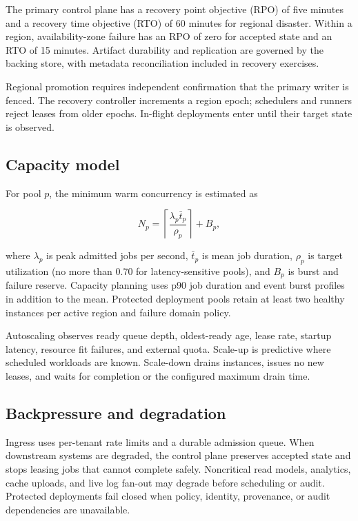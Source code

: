 The primary control plane has a recovery point objective (RPO) of five minutes and a
recovery time objective (RTO) of 60 minutes for regional disaster. Within a region,
availability-zone failure has an RPO of zero for accepted state and an RTO of 15 minutes.
Artifact durability and replication are governed by the backing store, with metadata
reconciliation included in recovery exercises.

Regional promotion requires independent confirmation that the primary writer is fenced.
The recovery controller increments a region epoch; schedulers and runners reject leases
from older epochs. In-flight deployments enter  until
their target state is observed.

\subsection{Capacity model}

For pool $p$, the minimum warm concurrency is estimated as

\[
  N_p = \left\lceil \frac{\lambda_p \bar{t}_p}{\rho_p} \right\rceil + B_p,
\]

where $\lambda_p$ is peak admitted jobs per second, $\bar{t}_p$ is mean job duration,
$\rho_p$ is target utilization (no more than 0.70 for latency-sensitive pools), and
$B_p$ is burst and failure reserve. Capacity planning uses p90 job duration and event
burst profiles in addition to the mean. Protected deployment pools retain at least two
healthy instances per active region and failure domain policy.

Autoscaling observes ready queue depth, oldest-ready age, lease rate, startup latency,
resource fit failures, and external quota. Scale-up is predictive where scheduled
workloads are known. Scale-down drains instances, issues no new leases, and waits for
completion or the configured maximum drain time.

\subsection{Backpressure and degradation}

Ingress uses per-tenant rate limits and a durable admission queue. When downstream
systems are degraded, the control plane preserves accepted state and stops leasing
jobs that cannot complete safely. Noncritical read models, analytics, cache uploads,
and live log fan-out may degrade before scheduling or audit. Protected deployments
fail closed when policy, identity, provenance, or audit dependencies are unavailable.

